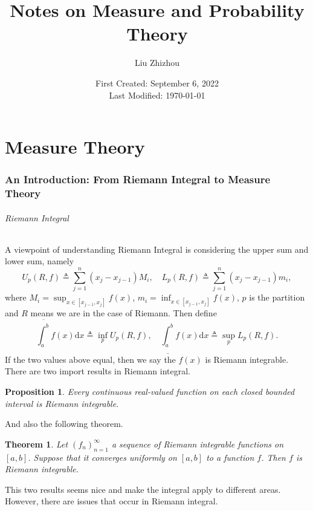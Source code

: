 \documentclass[12pt,a4paper]{report}
\title{Notes on Measure and Probability Theory}
\author{Liu Zhizhou}
\date{First Created: September 6, 2022\\
	Last Modified: \today}
\numberwithin{equation}{section}
\theoremstyle{mystyle}
\newtheorem{theorem}[definition]{Theorem}
\newtheorem{proposition}[definition]{Proposition}
\renewcommand{\d}{\mathrm{d}}
\begin{document}
	{\sffamily \maketitle}
	
	
	\tableofcontents

	
	\newcommand{\A}{\mathscr{A}}
	\part{Measure Theory}
	\section{An Introduction: From Riemann Integral to Measure Theory}
	\paragraph{Riemann Integral}
	A viewpoint of understanding Riemann Integral is considering the upper sum and lower sum, namely
	$$
	U_p(R,f)\triangleq \sum_{j=1}^n (x_j-x_{j-1})M_i,
	\quad 
	L_p(R,f)\triangleq \sum_{j=1}^n (x_j-x_{j-1})m_i,
	$$
	where $M_i=\sup_{x\in [x_{j-1},x_j]}f(x)$, $m_i=\inf_{x\in [x_{j-1},x_j]}f(x)$, $p$ is the partition and $R$ means we are in the case of Riemann.
	Then define
	$$
	\overline{\int_a^b} f(x) \d x\triangleq\inf_p U_p(R,f),
	\quad
	\underline{\int_a^b} f(x) \d x\triangleq\sup_p L_p(R,f).
	$$
	If the two values above equal, then we say the $f(x)$ is Riemann integrable. There are two import results in Riemann integral.
	\begin{proposition}
		Every continuous real-valued function on each closed bounded interval is Riemann integrable.
	\end{proposition}
	And also the following theorem.
	\begin{theorem}
		Let $(f_n)_{n=1}^\infty$ a sequence of Riemann integrable functions on $[a,b]$. Suppose that it converges uniformly on $[a,b]$ to a function $f$. Then $f$ is Riemann integrable.
	\end{theorem}
	This two results seems nice and make the integral apply to different areas. However, there are issues that occur in Riemann integral.
\end{document}
